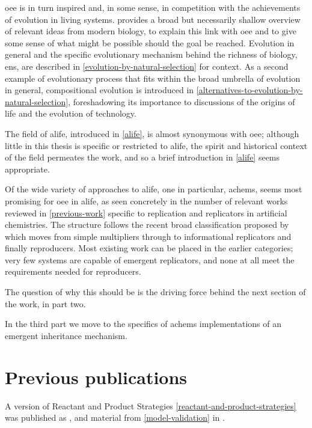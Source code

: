 \Gls{oee} is in turn inspired and, in some sense, in competition with the achievements of evolution in living systems.  provides a broad but necessarily shallow overview of relevant ideas from modern biology, to explain this link with \gls{oee} and to give some sense of what might be possible should the goal be reached. Evolution in general and the specific evolutionary mechanism behind the richness of biology, \gls{ens}, are described in \cref{evolution-by-natural-selection} for context. As a second example of evolutionary process that fits within the broad umbrella of evolution in general, compositional evolution is introduced in \cref{alternatives-to-evolution-by-natural-selection}, foreshadowing its importance to discussions of the origins of life and the evolution of technology.

The field of \gls{alife}, introduced in \cref{alife}, is almost synonymous with \gls{oee}; although little in this thesis is specific or restricted to \gls{alife}, the spirit and historical context of the field permeates the work, and so a brief introduction in \cref{alife} seems appropriate. 

Of the wide variety of approaches to \gls{alife}, one in particular, \glspl{achem}, seems most promising for \gls{oee} in \gls{alife}, as seen concretely in the number of relevant works reviewed in \cref{previous-work} specific to replication and replicators in artificial chemistries. The structure follows the recent broad classification proposed by \cite{Zachar2010} which moves from simple multipliers through to informational replicators and finally reproducers. Most existing work can be placed in the earlier categories; very few systems are capable of emergent replicators, and none at all meet the requirements needed for reproducers.

\begin{DRAFT}
The question of why this should be is the driving force behind the next section of the work, in part two. 

In the third part we move to the specifics of \glspl{achem} implementations of an emergent inheritance mechanism.  
\end{DRAFT}

\section{Previous publications}\label{previous-publications}

A version of Reactant and Product Strategies \cref{reactant-and-product-strategies} was published as \cite{Young2015}, and material from \cref{model-validation} in \cite{Young2013}.

